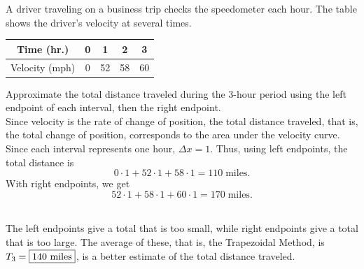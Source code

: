 \documentclass{book}
\begin{document}
\begin{Exam} A driver traveling on a business trip checks the speedometer each hour. The table shows the driver's velocity at several times. \\

\begin{center}
\begin{tabular}{c|cccc}

Time (hr.) & 0 & 1 & 2 & 3 \\ \hline
Velocity (mph) & 0 & 52 & 58 & 60 
\end{tabular}
\end{center}\vs

Approximate the total distance traveled during the 3-hour period using the left endpoint of each interval, then the right endpoint.\\

Since velocity is the rate of change of position, the total distance traveled, that is, the total change of position, corresponds to the area under the velocity curve. Since each interval represents one hour, $\Delta x = 1$. Thus, using left endpoints, the total distance is \[0\cdot 1 + 52\cdot 1 + 58\cdot 1 = 110\; \mbox{miles}.\] With right endpoints, we get \[52\cdot 1 + 58\cdot 1 + 60\cdot 1 = 170\;\mbox{miles}.\]\

The left endpoints give a total that is too small, while right endpoints give a total that is too large. The average of these, that is, the Trapezoidal Method, is $T_3 =  \fbox{140 miles}$, is a better estimate of the total distance traveled.
 \end{Exam}\vs
 
%
\end{document}
